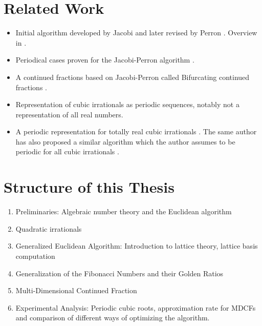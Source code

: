 \section{Related Work}

\begin{itemize}
  \item Initial algorithm developed by Jacobi \cite{Jacobi68} and later revised
    by Perron \cite{Perron07}. Overview in \cite{Bernstein71}.
  \item
    Periodical cases proven for the Jacobi-Perron algorithm \cite{Bernstein64}.
  \item
    A continued fractions based on Jacobi-Perron called Bifurcating continued
    fractions \cite{Gupta00}.
  \item
    Representation of cubic irrationals as periodic sequences, notably not a representation of all real numbers. \cite{Murru15}
  \item
    A periodic representation for totally real cubic irrationals \cite{Karpenkov24}.
    The same author has also proposed a similar algorithm which the author
    assumes to be periodic for all cubic irrationals \cite{Karpenkov21}.
\end{itemize}

\section{Structure of this Thesis}

\begin{enumerate}
  \item Preliminaries: Algebraic number theory and the Euclidean algorithm
  \item Quadratic irrationals
  \item Generalized Euclidean Algorithm: Introduction to lattice theory, lattice basis computation
  \item Generalization of the Fibonacci Numbers and their Golden Ratios
  \item Multi-Dimensional Continued Fraction
  \item Experimental Analysis: Periodic cubic roots, approximation rate for
    MDCFs and comparison of different ways of optimizing the algorithm.
\end{enumerate}
